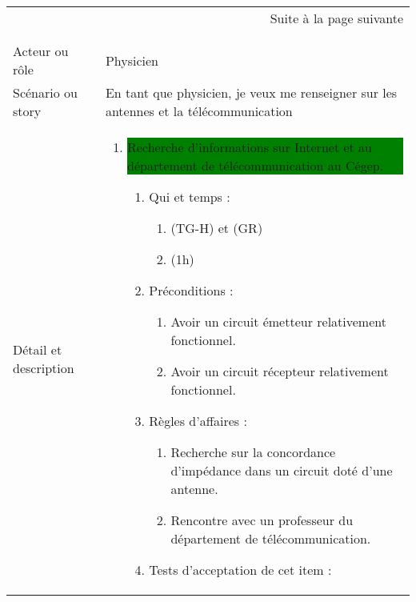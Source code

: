 \begin{longtable}{|l|p{}|}
\multicolumn{2}{r}{Suite à la page suivante} \\
\endfoot

\multicolumn{2}{r}{} \\
\endlastfoot

\hline
    \rowcolor{Gray}
    \multicolumn{2}{|l|}{1} \\
\hline
    Acteur ou rôle & Physicien  \\
\hline
    Scénario ou story & En tant que physicien, je veux me renseigner sur les antennes et la télécommunication \\
\hline
    Détail et description &
        \begin{enumerate}[label*=\arabic*.]
       \item \colorbox{Green}{\parbox{13cm}{Recherche d'informations sur Internet et au département de télécommunication au Cégep.}}
            \begin{enumerate}[label*=\arabic*.]
                    \item Qui et temps :
                    \begin{enumerate}[label*=\arabic*.]
                        \item (TG-H) et (GR)
                        \item (1h)
                    \end{enumerate}
                    \item Préconditions :
                    \begin{enumerate}[label*=\arabic*.]
                    \item Avoir un circuit émetteur relativement fonctionnel.
                    \item Avoir un circuit récepteur relativement fonctionnel.
                    \end{enumerate}
                    \item Règles d’affaires :
                    \begin{enumerate}[label*=\arabic*.]
                        \item Recherche sur la concordance d'impédance dans un circuit doté d'une antenne.
                        \item Rencontre avec un professeur du département de télécommunication.
                    \end{enumerate}
                    \item Tests d'acceptation de cet item :

\end{enumerate}
\end{enumerate}
\end{longtable}
